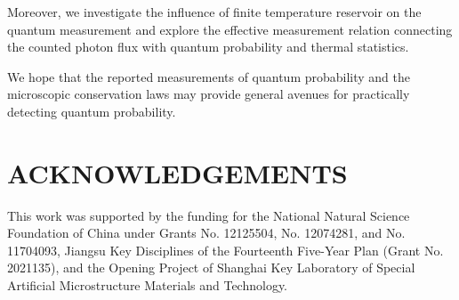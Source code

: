 \documentclass[twocolumn,showpacs,preprintnumbers,amsmath,amssymb]{revtex4}
\begin{document}
Moreover, we investigate the influence of finite temperature reservoir on the quantum measurement and explore the effective measurement relation connecting the counted photon flux with quantum probability and thermal statistics.

We hope that the reported measurements  of quantum probability and the microscopic conservation laws may provide general avenues for practically detecting quantum probability.
	
	
\section{ACKNOWLEDGEMENTS}
This work was supported by the funding for the National Natural Science Foundation of China under Grants No. 12125504, No. 12074281, and No. 11704093, Jiangsu Key Disciplines of the Fourteenth Five-Year Plan (Grant No. 2021135), and the Opening Project of Shanghai Key Laboratory of Special Artificial Microstructure Materials and Technology.
	
	
\appendix*
\end{document}

